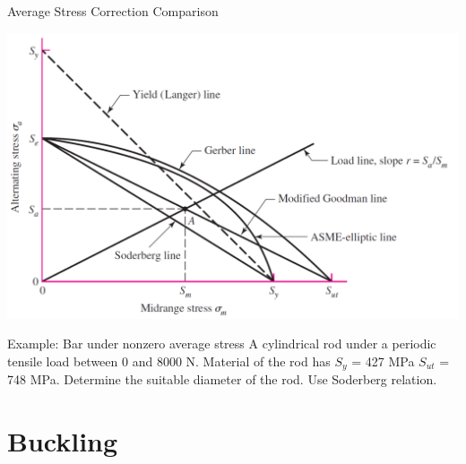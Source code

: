 \documentclass[10pt, svgnames]{beamer}
\begin{document}
\begin{frame}[label={sec:orgbb6253f}]{Average Stress Correction Comparison}
\begin{center}
\includegraphics[width=.9\linewidth]{pictures/stresscorrection.pdf}
\end{center}
\end{frame}


\begin{frame}[label={sec:org741fbd3}]{Example: Bar under nonzero average stress}
A cylindrical rod under a periodic tensile load between 0 and 8000 N. Material of the rod has \(S_y\) = 427 MPa  \(S_{ut}\) = 748 MPa. Determine the suitable diameter of the rod. Use Soderberg relation.

\begin{figure}[h]
\centering
{}
\end{figure}
\end{frame}

\section{Buckling}
\label{sec:org478fae7}
\end{document}

